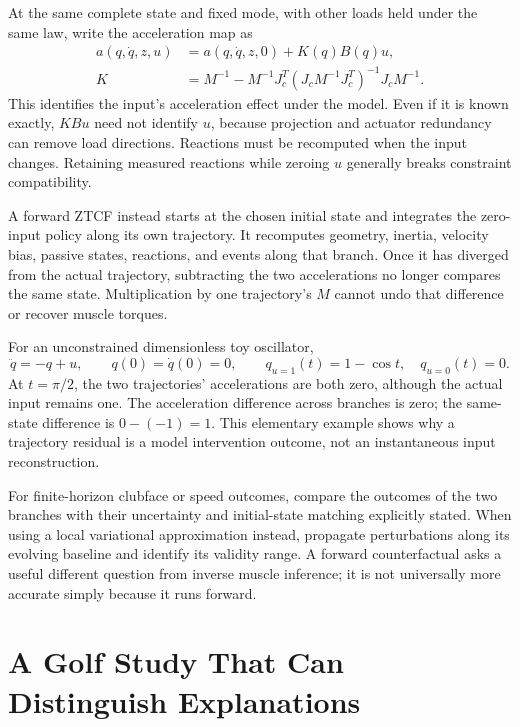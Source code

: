 At the same complete state and fixed mode, with other loads held under the
same law, write the acceleration map as
\begin{equation}
 \begin{aligned}
 a(q,\dot q,z,u)&=a(q,\dot q,z,0)+K(q)B(q)u,\\
 K&=M^{-1}-M^{-1}J_c^T(J_cM^{-1}J_c^T)^{-1}J_cM^{-1}.
 \end{aligned}
 \label{eq:same_state_control_effect}
\end{equation}
This identifies the input's acceleration effect under the model. Even if it
is known exactly, $KBu$ need not identify $u$, because projection and actuator
redundancy can remove load directions. Reactions must be recomputed when the
input changes. Retaining measured reactions while zeroing $u$ generally breaks
constraint compatibility.

A forward ZTCF instead starts at the chosen initial state and integrates the
zero-input policy along its own trajectory. It recomputes geometry, inertia,
velocity bias, passive states, reactions, and events along that branch. Once it
has diverged from the actual trajectory, subtracting the two accelerations no
longer compares the same state. Multiplication by one trajectory's $M$ cannot
undo that difference or recover muscle torques.

For an unconstrained dimensionless toy oscillator,
\begin{equation}
 \ddot q=-q+u,\qquad q(0)=\dot q(0)=0,
 \qquad q_{u=1}(t)=1-\cos t,\quad q_{u=0}(t)=0.
 \label{eq:forward_branch_counterexample}
\end{equation}
At $t=\pi/2$, the two trajectories' accelerations are both zero, although the
actual input remains one. The acceleration difference across branches is zero;
the same-state difference is $0-(-1)=1$. This elementary example shows why a
trajectory residual is a model intervention outcome, not an instantaneous
input reconstruction.

For finite-horizon clubface or speed outcomes, compare the outcomes of the two
branches with their uncertainty and initial-state matching explicitly stated.
When using a local variational approximation instead, propagate perturbations
along its evolving baseline and identify its validity range. A forward
counterfactual asks a useful different question from inverse muscle inference;
it is not universally more accurate simply because it runs forward.

\section{A Golf Study That Can Distinguish Explanations}
\label{sec:synthesis_inverse_dynamics}

